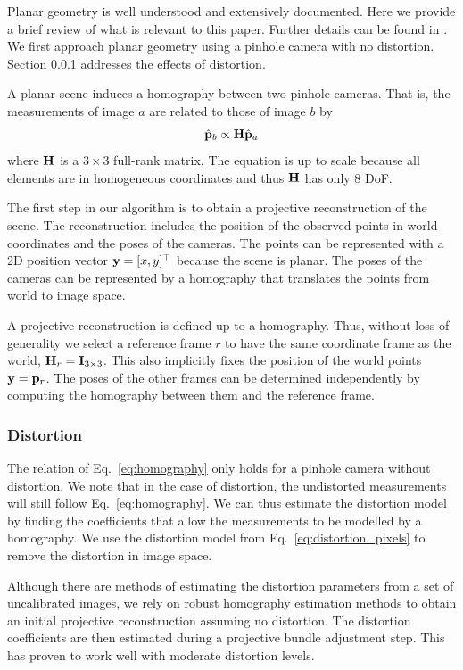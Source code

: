 \documentclass[10pt,twocolumn,letterpaper]{article}
\begin{document}
Planar geometry is well understood and extensively documented. Here we provide a brief review of what is relevant to this paper. Further details can be found in \cite{hartley2000}. We first approach planar geometry using a pinhole camera with no distortion. Section \ref{sec:planar:distortion} addresses the effects of distortion.

A planar scene induces a homography between two pinhole cameras. That is, the measurements of image $a$ are related to those of image $b$ by
%
\begin{align}
\hat{\mathbf{p}}_b \propto \mathbf{H} \hat{\mathbf{p}}_a 
\label{eq:homography}
\end{align}
%
where $\mathbf{H}$ is a $3 \times 3$ full-rank matrix. The equation is up to scale because all elements are in homogeneous coordinates and thus $\mathbf{H}$ has only 8 DoF.

The first step in our algorithm is to obtain a projective reconstruction of the scene. The reconstruction includes the position of the observed points in world coordinates and the poses of the cameras. The points can be represented with a 2D position vector $\mathbf{y}=[x,y]^\top$ because the scene is planar. The poses of the cameras can be represented by a homography that translates the points from world to image space. 

A projective reconstruction is defined up to a homography. Thus, without loss of generality we select a reference frame $r$ to have the same coordinate frame as the world, \ie $\mathbf{H}_r = \mathbf{I}_{3 \times 3}$. This also implicitly fixes the position of the world points $\mathbf{y}=\mathbf{p}_r$. The poses of the other frames can be determined independently by computing the homography between them and the reference frame.

\subsubsection{Distortion}
\label{sec:planar:distortion}

The relation of Eq.~\eqref{eq:homography} only holds for a pinhole camera without distortion. We note that in the case of distortion, the undistorted measurements will still follow Eq.~\eqref{eq:homography}. We can thus estimate the distortion model by finding the coefficients that allow the measurements to be modelled by a homography. We use the distortion model from Eq.~\eqref{eq:distortion_pixels} to remove the distortion in image space.

Although there are methods of estimating the distortion parameters from a set of uncalibrated images, we rely on robust homography estimation methods to obtain an initial projective reconstruction assuming no distortion. The distortion coefficients are then estimated during a projective bundle adjustment step. This has proven to work well with moderate distortion levels.
\end{document}
